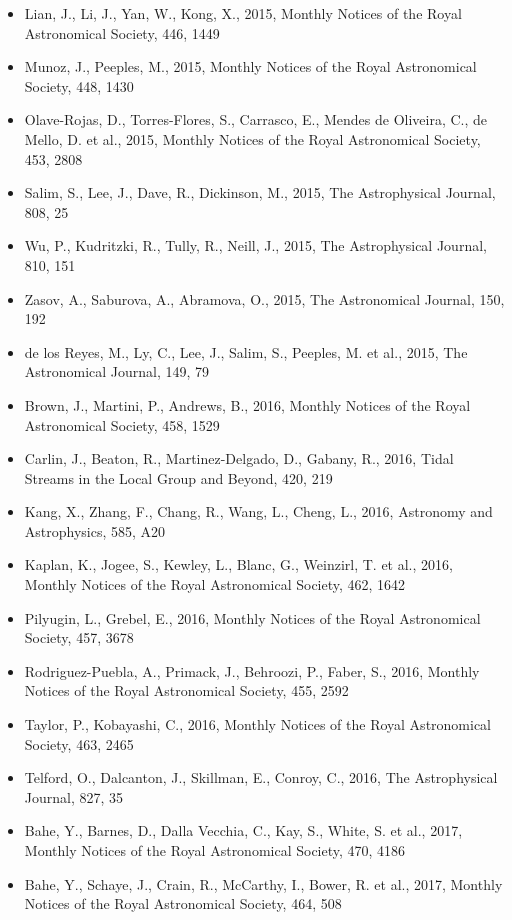\documentclass{letter}
\begin{document}
\begin{enumerate}
\begin{itemize}
\item Lian, J., Li, J., Yan, W., Kong, X., 2015, Monthly Notices of the Royal Astronomical Society, 446, 1449
\item Munoz, J., Peeples, M., 2015, Monthly Notices of the Royal Astronomical Society, 448, 1430
\item Olave-Rojas, D., Torres-Flores, S., Carrasco, E., Mendes de Oliveira, C., de Mello, D. et al., 2015, Monthly Notices of the Royal Astronomical Society, 453, 2808
\item Salim, S., Lee, J., Dave, R., Dickinson, M., 2015, The Astrophysical Journal, 808, 25
\item Wu, P., Kudritzki, R., Tully, R., Neill, J., 2015, The Astrophysical Journal, 810, 151
\item Zasov, A., Saburova, A., Abramova, O., 2015, The Astronomical Journal, 150, 192
\item de los Reyes, M., Ly, C., Lee, J., Salim, S., Peeples, M. et al., 2015, The Astronomical Journal, 149, 79
\item Brown, J., Martini, P., Andrews, B., 2016, Monthly Notices of the Royal Astronomical Society, 458, 1529
\item Carlin, J., Beaton, R., Martinez-Delgado, D., Gabany, R., 2016, Tidal Streams in the Local Group and Beyond, 420, 219
\item Kang, X., Zhang, F., Chang, R., Wang, L., Cheng, L., 2016, Astronomy and Astrophysics, 585, A20
\item Kaplan, K., Jogee, S., Kewley, L., Blanc, G., Weinzirl, T. et al., 2016, Monthly Notices of the Royal Astronomical Society, 462, 1642
\item Pilyugin, L., Grebel, E., 2016, Monthly Notices of the Royal Astronomical Society, 457, 3678
\item Rodriguez-Puebla, A., Primack, J., Behroozi, P., Faber, S., 2016, Monthly Notices of the Royal Astronomical Society, 455, 2592
\item Taylor, P., Kobayashi, C., 2016, Monthly Notices of the Royal Astronomical Society, 463, 2465
\item Telford, O., Dalcanton, J., Skillman, E., Conroy, C., 2016, The Astrophysical Journal, 827, 35
\item Bahe, Y., Barnes, D., Dalla Vecchia, C., Kay, S., White, S. et al., 2017, Monthly Notices of the Royal Astronomical Society, 470, 4186
\item Bahe, Y., Schaye, J., Crain, R., McCarthy, I., Bower, R. et al., 2017, Monthly Notices of the Royal Astronomical Society, 464, 508

\end{itemize}
\end{enumerate}
\end{document}
